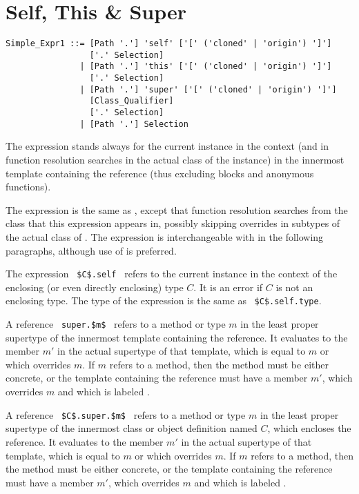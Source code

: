 \section{Self, This \& Super}
\label{sec:self-this-super}

\syntax\begin{lstlisting}
Simple_Expr1 ::= [Path '.'] 'self' ['[' ('cloned' | 'origin') ']']
                 ['.' Selection]
               | [Path '.'] 'this' ['[' ('cloned' | 'origin') ']']
                 ['.' Selection]
               | [Path '.'] 'super' ['[' ('cloned' | 'origin') ']']
                 [Class_Qualifier] 
                 ['.' Selection]
               | [Path '.'] Selection
\end{lstlisting}

The expression  stands always for the current instance in the context (and in function resolution searches in the actual class of the instance) in the innermost template containing the reference (thus excluding blocks and anonymous functions). 

The expression  is the same as , except that function resolution searches from the class that this expression appears in, possibly skipping overrides in subtypes of the actual class of . The  expression is interchangeable with  in the following paragraphs, although use of  is preferred. 

The expression ~\lstinline!$C$.self!~ refers to the current instance in the context of the enclosing (or even directly enclosing) type $C$. It is an error if $C$ is not an enclosing type. The type of the expression is the same as ~\lstinline!$C$.self.type!. 

A reference ~\lstinline!super.$m$!~ refers to a method or type $m$ in the least proper supertype of the innermost template containing the reference. It evaluates to the member $m'$ in the actual supertype of that template, which is equal to $m$ or which overrides $m$. If $m$ refers to a method, then the method must be either concrete, or the template containing the reference must have a member $m'$, which overrides $m$ and which is labeled . 

A reference ~\lstinline!$C$.super.$m$!~ refers to a method or type $m$ in the least proper supertype of the innermost class or object definition named $C$, which encloses the reference. It evaluates to the member $m'$ in the actual supertype of that template, which is equal to $m$ or which overrides $m$. If $m$ refers to a method, then the method must be either concrete, or the template containing the reference must have a member $m'$, which overrides $m$ and which is labeled . 

